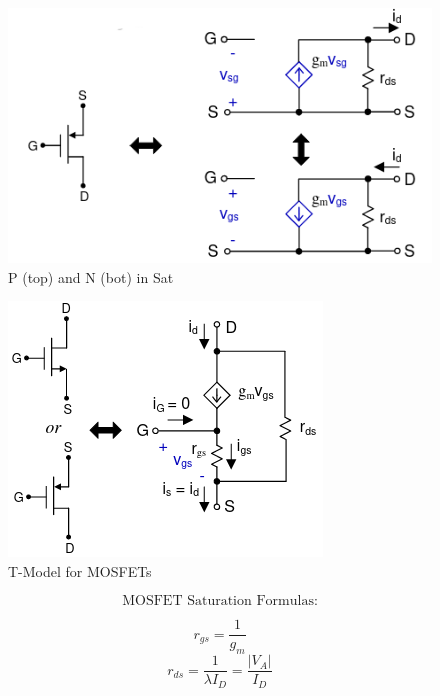 \documentclass[12pt]{article}
\begin{document}
  \begin{multicols}{2}

  \begin{figure}[H]
    \centering
    \includegraphics[height=.23\textheight]{Figures/SmallMOS}
    \caption{P (top) and N (bot) in Sat}
    \label{fig:10}
  \end{figure}

  \begin{figure}[H]
    \centering
    \includegraphics[height=.23\textheight]{Figures/MOSTModel}
    \caption{T-Model for MOSFETs}
    \label{fig:11}
  \end{figure}
 
  \end{multicols}

  \vspace{-40pt}

  \begin{center}
    $$\boxed{\text{MOSFET Saturation Formulas:}}$$
  \end{center}

  \begin{multicols}{2}

  $$r_{gs}=\frac{1}{g_m}$$
  $$r_{ds}=\frac{1}{\lambda I_D}=\frac{|V_A|}{I_D}$$
  \end{multicols}
\end{document}
